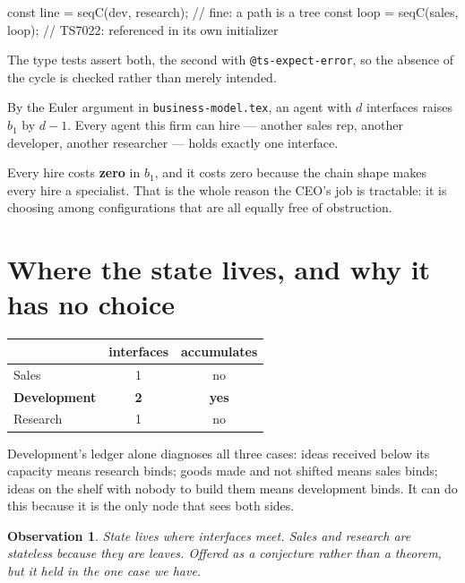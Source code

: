 \documentclass[11pt,a4paper]{article}
\newtheorem*{obs}{Observation}
\begin{document}
\begin{term}
const line = seqC(dev, research);   // fine: a path is a tree
const loop = seqC(sales, loop);     // TS7022: referenced in its own initializer
\end{term}

The type tests assert both, the second with \texttt{@ts-expect-error}, so the
absence of the cycle is checked rather than merely intended.

By the Euler argument in \texttt{business-model.tex}, an agent with $d$
interfaces raises $b_1$ by $d-1$. Every agent this firm can hire --- another
sales rep, another developer, another researcher --- holds exactly one interface.

\begin{sectionbox}
Every hire costs \textbf{zero} in $b_1$, and it costs zero because the chain
shape makes every hire a specialist. That is the whole reason the CEO's job is
tractable: it is choosing among configurations that are all equally free of
obstruction.
\end{sectionbox}

\section{Where the state lives, and why it has no choice}

\begin{center}
\begin{tabular}{@{}lcc@{}}
\toprule
& interfaces & accumulates \\
\midrule
Sales & 1 & no \\
\textbf{Development} & \textbf{2} & \textbf{yes} \\
Research & 1 & no \\
\bottomrule
\end{tabular}
\end{center}

Development's ledger alone diagnoses all three cases: ideas received below its
capacity means research binds; goods made and not shifted means sales binds;
ideas on the shelf with nobody to build them means development binds. It can do
this because it is the only node that sees both sides.

\begin{obs}
State lives where interfaces meet. Sales and research are stateless
\emph{because} they are leaves. Offered as a conjecture rather than a theorem,
but it held in the one case we have.
\end{obs}
\end{document}
